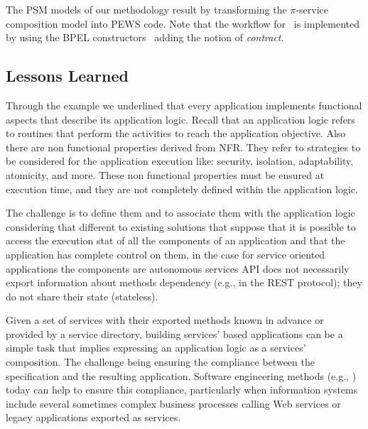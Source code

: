 The  PSM models of our methodology result by transforming the $\pi$-service composition model into PEWS code.
Note that the workflow for \FlyingPig\ is implemented by using the BPEL constructors~\cite{BPEL} adding the notion of \textit{contract}.


\subsection{Lessons Learned}

Through the example we underlined that every application implements functional aspects that describe its application logic.
Recall that an application logic refers to routines that perform the activities to reach the application objective.
Also there are non functional properties derived from NFR. They refer to strategies to be considered for the application execution like: security, isolation, adaptability, atomicity, and more.
These non functional properties must be ensured at execution time, and they are not completely defined within the application logic.

The challenge is to define them and to associate them with the application logic considering that different to existing solutions that suppose that it is possible to access the execution stat of all the components  of an application and that the application has complete control on them, in the case for service oriented applications  the components are autonomous services
API does not necessarily export information about methods dependency (e.g., in the REST protocol);
they do not share their state (stateless).

Given a set of services with their exported methods known in advance or provided by a  service directory, building services' based applications can be  a simple task that implies expressing an application logic as a services' composition. The challenge being  ensuring the compliance between the specification and the resulting application. Software engineering methods (e.g., \cite{1,2,decastro1,PapazoglouH06}) today can help to ensure this compliance, particularly when information systems include several sometimes complex business processes calling Web services or legacy applications exported as services.

